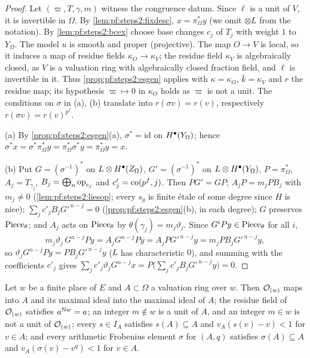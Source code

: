 \begin{proof}
Let $(\varpi,T,\gamma,m)$ witness the congruence datum. Since $\ell$ is a unit of $V$, it is
invertible in $\Omega$. By \cref{lem:pf:steps2:fixdesc}, $x=\pi_\Omega^\ast y$ (we omit $\otimes L$
from the notation). By \cref{lem:pf:steps2:bcex} choose base changes $c_j$ of $T_j$ with weight $1$ to
$Y_\Omega$. The model $u$ is smooth and proper (projective). The map $O\to V$ is local, so it
induces a map of residue fields $\kappa_O\to\kappa_V$; the residue field $\kappa_V$ is algebraically
closed, as $V$ is a valuation ring with algebraically closed fraction field, and $\ell$ is invertible
in it. Thus \cref{prop:pf:steps2:esgen} applies with $\kappa=\kappa_O$, $\bar k=\kappa_V$ and $r$ the
residue map; its hypothesis $\varpi\mapsto0$ in $\kappa_O$ holds as $\varpi$ is not a unit. The
conditions on $\sigma$ in (a), (b) translate into $r(\sigma v)=r(v)$, respectively
$r(\sigma v)=r(v)^{p^f}$.

(a) By \cref{prop:pf:steps2:esgen}(a), $\sigma^\ast=\mathrm{id}$ on $H^{\bullet}(Y_\Omega)$; hence
$\sigma^\ast x=\sigma^\ast\pi_\Omega^\ast y=\pi_\Omega^\ast\sigma^\ast y=\pi_\Omega^\ast y=x$.

(b) Put $G=(\sigma^{-1})^\ast$ on $L\otimes H^{\bullet}(Z_\Omega)$, $G'=(\sigma^{-1})^\ast$ on
$L\otimes H^{\bullet}(Y_\Omega)$, $P=\pi_\Omega^\ast$, $A_j=T_{\gamma_j}$, $B_j=\bigoplus_n\mathrm{op}_{c_j}$
and $c'_j=\mathrm{co}(p^f,j)$. Then $PG'=GP$; $A_jP=m_jPB_j$ with $m_j\ne0$
(\cref{lem:pf:steps2:liesop}; every $s_g$ is finite \'etale of some degree since $H$ is nice);
$\sum_jc'_jB_jG'^{\,n-j}=0$ (\cref{prop:pf:steps2:esgen}(b), in each degree); $G$ preserves
$\mathrm{Piece}_\theta$; and $A_j$ acts on $\mathrm{Piece}_\theta$ by $\theta(\gamma_j)=m_j\vartheta_j$.
Since $G^iPy\in\mathrm{Piece}_\theta$ for all $i$,
\[
  m_j\vartheta_j\,G^{n-j}Py=A_jG^{n-j}Py=A_jPG'^{\,n-j}y=m_jPB_jG'^{\,n-j}y,
\]
so $\vartheta_jG^{n-j}Py=PB_jG'^{\,n-j}y$ ($L$ has characteristic $0$), and summing with the
coefficients $c'_j$ gives $\sum_jc'_j\vartheta_jG^{n-j}x=P\bigl(\sum_jc'_jB_jG'^{\,n-j}y\bigr)=0$.
\end{proof}

\begin{lemma}\label{lem:pf:steps2:placedata}
Let $w$ be a finite place of $E$ and $A\subset\Omega$ a valuation ring over $w$. Then $\mathcal{O}_{(w)}$
maps into $A$ and its maximal ideal into the maximal ideal of $A$; the residue field of $\mathcal{O}_{(w)}$
satisfies $a^{\mathrm{N}w}=a$; an integer $m\notin w$ is a unit of $A$, and an integer $m\in w$ is not a
unit of $\mathcal{O}_{(w)}$; every $s\in I_A$ satisfies $s(A)\subseteq A$ and $v_A(s(v)-v)<1$ for $v\in A$; and
every arithmetic Frobenius element $\sigma$ for $(A,q)$ satisfies $\sigma(A)\subseteq A$ and
$v_A(\sigma(v)-v^q)<1$ for $v\in A$.
\end{lemma}

